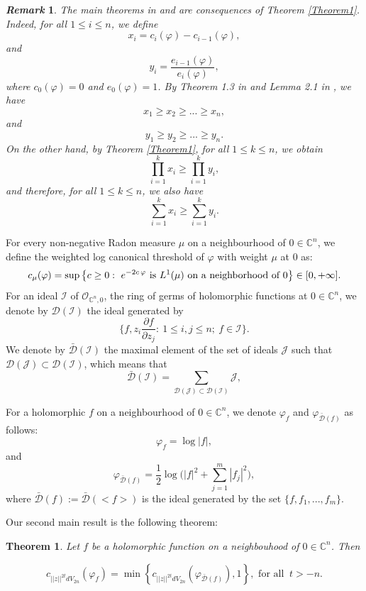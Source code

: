 \documentclass[a4paper,oneside,reqno,11pt]{article}
\newtheorem{theorem}{Theorem}[section]
\newtheorem{remark}{\it Remark\/}
\begin{document}
\begin{remark} The main theorems in \cite{DH14} and \cite{Hi18} are consequences of Theorem \ref{Theorem1}. Indeed, for all $1\leq i\leq n$, we define
$$x_i = c_i (\varphi ) - c_{ i - 1 } ( \varphi ),$$
and 
$$y_i = \frac { e_{ i - 1 } ( \varphi ) } { e_i ( \varphi ) },$$
where $c_0 ( \varphi ) = 0$ and $e_{ 0 } ( \varphi ) = 1$. By Theorem 1.3 in \cite{Hi17} and Lemma 2.1 in \cite{DH14}, we have
$$x_1\geq x_2\geq ... \geq x_n,$$
and
$$y_1\geq y_2 \geq ... \geq y_n.$$
On the other hand, by Theorem \ref{Theorem1}, for all $1\leq k\leq n$, we obtain
$$\prod\limits_{ i = 1 }^{ k } x_i \geq \prod\limits_{ i = 1 }^{ k } y_i ,$$
and therefore, for all $1\leq k\leq n$, we also have
$$\sum\limits_{ i = 1 }^{ k } x_i\geq \sum\limits_{ i = 1 }^{ k } y_i  .$$
\end{remark} 

For every non-negative Radon measure $\mu$ on a neighbourhood of $0\in\mathbb C^n$, we define the weighted log canonical threshold of $\varphi$ with weight $\mu$ at $0$ as:
$$c_{\mu}( \varphi ) = \sup\big\{ c \geq 0:\ e^{-2c\,\varphi} \hbox{ is } L^1(\mu ) \hbox{ on a neighborhood of }0\big\}\in [0,+\infty].$$
For an ideal $\mathcal I$ of $\mathcal O_{ \mathbb C^n, 0}$, the ring of germs of holomorphic functions at $0\in\mathbb C^n$, we denote by $\mathcal { D } ( \mathcal I )$ the ideal generated by 
$$\{ f, z_i \frac { \partial f } { \partial z_j }:\ 1\leq i,j\leq n;\ f\in\mathcal I\}.$$
We denote by $\bar{ \mathcal D } (\mathcal I)$ the maximal element of the set of ideals $\mathcal J$ such that $\mathcal { D } ( \mathcal J )\subset \mathcal { D } ( \mathcal I )$, which means that
$$\bar{ \mathcal {D} } (\mathcal I) = \sum\limits_{ \mathcal {D} ( \mathcal J )\subset \mathcal { D } ( \mathcal I ) } \mathcal J,$$

For a holomorphic $f$ on a neighbourhood of $0\in\mathbb C^n$, we denote $\varphi_{ f }$ and $\varphi_{ \bar { \mathcal  D } (f) }$ as follows:
$$\varphi_{ f } = \log |f|,$$
and
$$\varphi_{ \bar { \mathcal  D } (f) } = \frac { 1 } { 2 } \log \big( | f |^2 + \sum\limits_{j=1}^m |f_j|^2 \big ),$$
where $\bar { \mathcal  D } ( f ):= \bar { \mathcal  D } ( <f> )$ is the ideal generated by the set $\{ f, f_1,...,f_m \}$.

Our second main result is the following theorem:

\begin{theorem}\label{Theorem2} 
Let $f$ be a holomorphic function on a neighbouhood of $0\in\mathbb C^n$. Then

$$c_{ || z ||^{2t} dV_{2n} } ( \varphi_{ f } ) = \min \left\{ c_{ || z ||^{2t} dV_{2n} } ( \varphi_{ \bar { \mathcal  D } ( f ) } ), 1 \right\}, \text{ for all }\ t > -n.$$

\end{theorem}
\end{document}
